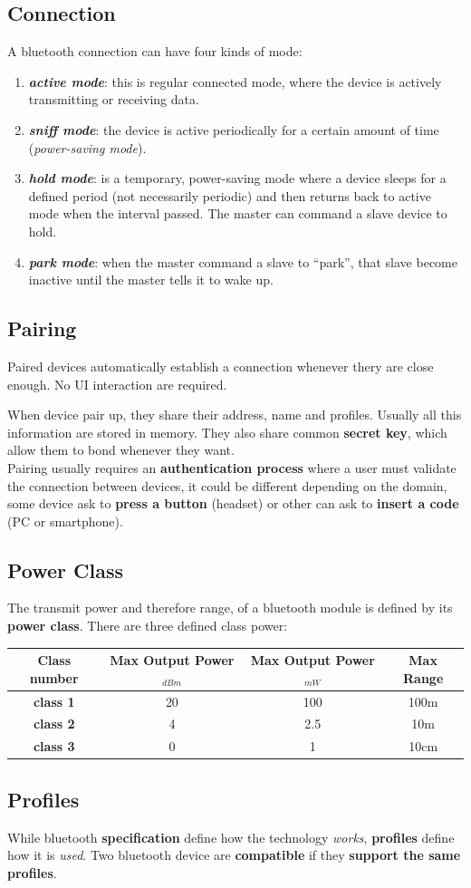 \subsection{Connection}
A bluetooth connection can have four kinds of mode:
\begin{enumerate}[nosep]
    \item \textbf{\textit{active mode}}: this is regular connected mode, where the device is actively transmitting or receiving data.
    \item \textbf{\textit{sniff mode}}: the device is active periodically for a certain amount of time (\textit{power-saving mode}).
    \item \textbf{\textit{hold mode}}: is a temporary, power-saving mode where a device sleeps for a defined period (not necessarily periodic) and then returns back to active mode when the interval passed. The master can command a slave device to hold.
    \item \textbf{\textit{park mode}}: when the master command a slave to ``park'', that slave become inactive until the master tells it to wake up.
\end{enumerate}

\subsection{Pairing}
\begin{boxA}
    Paired devices automatically establish a connection whenever thery are close enough. No UI interaction are required.
\end{boxA}
When device pair up, they share their address, name and profiles. Usually all this information are stored in memory. They also share common \textbf{secret key}, which allow them to bond whenever they want. \\
Pairing usually requires an \textbf{authentication process} where a user must validate the connection between devices, it could be different depending on the domain, some device ask to \textbf{press a button} (headset) or other can ask to \textbf{insert a code} (PC or smartphone).

\newpage
\subsection{Power Class}
The transmit power and therefore range, of a bluetooth module is defined by its \textbf{power class}. There are three defined class power:
\begin{center}
    \begin{tabular}{ | c | c | c | c | } \hline
        \textbf{Class number} & \textbf{Max Output Power}$_{dBm}$ & \textbf{Max Output Power}$_{mW}$ & \textbf{Max Range} \\ \hline
        \textbf{class 1} & 20 & 100 & 100m \\ \hline
        \textbf{class 2} & 4 & 2.5 & 10m \\ \hline
        \textbf{class 3} & 0 & 1 & 10cm \\ \hline
    \end{tabular}
\end{center}

\subsection{Profiles}
While bluetooth \textbf{specification} define how the technology \textit{works}, \textbf{profiles} define how it is \textit{used}. Two bluetooth device are \textbf{compatible} if they \textbf{support the same profiles}.